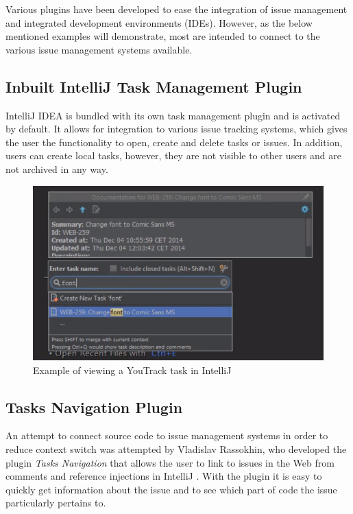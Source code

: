 \documentclass{4thYearProject}
\begin{document}
Various plugins have been developed to ease the integration of issue management and integrated development environments (IDEs). However, as the below mentioned examples will demonstrate, most are intended to connect to the various issue management systems available. 

\subsection{Inbuilt IntelliJ Task Management Plugin}

IntelliJ IDEA is bundled with its own task management plugin and is activated by default. It allows for integration to various issue tracking systems, which gives the user the functionality to open, create and delete tasks or issues. In addition, users can create local tasks, however, they are not visible to other users and are not archived in any way. 

\begin{figure}[H]
\includegraphics[scale=0.5]{IntelliJ_Tasks}
\centering
\caption{Example of viewing a YouTrack task in IntelliJ}\label{intellijtask}
\label{fig:intellijtask}
\end{figure}

\subsection{Tasks Navigation Plugin}

An attempt to connect source code to issue management systems in order to reduce context switch was attempted by Vladislav Rassokhin, who developed the plugin \textit{Tasks Navigation} that allows the user to link to issues in the Web from comments and reference injections in IntelliJ \cite{tasksnavigation}. With the plugin it is easy to quickly get information about the issue and to see which part of code the issue particularly pertains to. 
\end{document}
